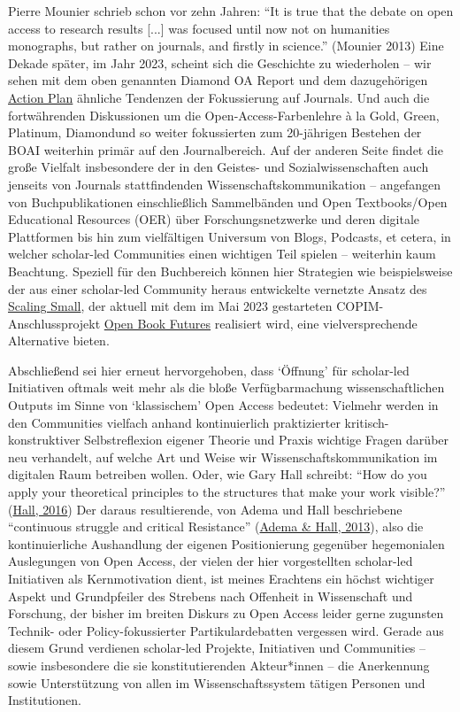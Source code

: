 \documentclass[a4paper,
fontsize=11pt,
oneside,
numbers=noperiodatend,
parskip=half-,
bibliography=totoc,
final
]{scrartcl}
\begin{document}
Pierre Mounier schrieb schon vor zehn Jahren: \enquote{It is true that
the debate on open access to research results {[}...{]} was focused
until now not on humanities monographs, but rather on journals, and
firstly in science.} (Mounier 2013) Eine Dekade später, im Jahr 2023,
scheint sich die Geschichte zu wiederholen -- wir sehen mit dem oben
genannten Diamond OA Report und dem dazugehörigen
\href{https://doi.org/10.5281/zenodo.6282403}{Action Plan} ähnliche
Tendenzen der Fokussierung auf Journals. Und auch die fortwährenden
Diskussionen um die Open-Access-Farbenlehre à la Gold, Green, Platinum,
Diamondund so weiter fokussierten zum 20-jährigen Bestehen der BOAI
weiterhin primär auf den Journalbereich. Auf der anderen Seite findet
die große Vielfalt insbesondere der in den Geistes- und
Sozialwissenschaften auch jenseits von Journals stattfindenden
Wissenschaftskommunikation -- angefangen von Buchpublikationen
einschließlich Sammelbänden und Open Textbooks/Open Educational
Resources (OER) über Forschungsnetzwerke und deren digitale Plattformen
bis hin zum vielfältigen Universum von Blogs, Podcasts, et cetera, in
welcher scholar-led Communities einen wichtigen Teil spielen --
weiterhin kaum Beachtung. Speziell für den Buchbereich können hier
Strategien wie beispielsweise der aus einer scholar-led Community heraus
entwickelte vernetzte Ansatz des
\href{https://doi.org/10.16997/wpcc.918}{Scaling Small}, der aktuell mit
dem im Mai 2023 gestarteten COPIM-Anschlussprojekt
\href{https://doi.org/10.21428/785a6451.39b2b1ea}{Open Book Futures}
realisiert wird, eine vielversprechende Alternative bieten.

Abschließend sei hier erneut hervorgehoben, dass \enquote*{Öffnung} für
scholar-led Initiativen oftmals weit mehr als die bloße Verfügbarmachung
wissenschaftlichen Outputs im Sinne von \enquote*{klassischem} Open
Access bedeutet: Vielmehr werden in den Communities vielfach anhand
kontinuierlich praktizierter kritisch-konstruktiver Selbstreflexion
eigener Theorie und Praxis wichtige Fragen darüber neu verhandelt, auf
welche Art und Weise wir Wissenschaftskommunikation im digitalen Raum
betreiben wollen. Oder, wie Gary Hall schreibt: \enquote{How do you
apply your theoretical principles to the structures that make your work
visible?}
(\href{https://mitpress.mit.edu/9780262034401/pirate-philosophy/}{Hall,
2016}) Der daraus resultierende, von Adema und Hall beschriebene
\enquote{continuous struggle and critical Resistance}
(\href{https://doi.org/10.3898/NewF.78.07.2013}{Adema \& Hall, 2013}),
also die kontinuierliche Aushandlung der eigenen Positionierung
gegenüber hegemonialen Auslegungen von Open Access, der vielen der hier
vorgestellten scholar-led Initiativen als Kernmotivation dient, ist
meines Erachtens ein höchst wichtiger Aspekt und Grundpfeiler des
Strebens nach Offenheit in Wissenschaft und Forschung, der bisher im
breiten Diskurs zu Open Access leider gerne zugunsten Technik- oder
Policy-fokussierter Partikulardebatten vergessen wird. Gerade aus diesem
Grund verdienen scholar-led Projekte, Initiativen und Communities --
sowie insbesondere die sie konstitutierenden Akteur*innen -- die
Anerkennung sowie Unterstützung von allen im Wissenschaftssystem tätigen
Personen und Institutionen.
\end{document}
